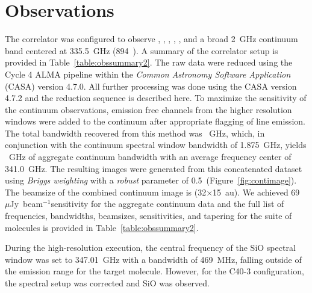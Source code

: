 \section{Observations}\label{sec:appobs}

The  correlator was configured to observe \lco, \lcso, \lhtcop, \lhtcn, \lsio, and a broad 2~GHz continuum band centered at 335.5~GHz (894~\micron). A summary of the correlator setup is provided in Table~\ref{table:obssummary2}. The raw data were reduced using the Cycle 4 ALMA pipeline within the \textit{Common Astronomy Software Application} (CASA) \citep{2007ASPC..376..127M} version 4.7.0. All further processing was done using the CASA version 4.7.2 and the reduction sequence is described here. To maximize the sensitivity of the continuum observations, emission free channels from the higher resolution windows were added to the continuum after appropriate flagging of line emission. The total bandwidth recovered from this method was ~GHz, which, in conjunction with the continuum spectral window bandwidth of 1.875~GHz, yields ~GHz of aggregate continuum bandwidth with an average frequency center of 341.0~GHz.
The resulting images were generated from this concatenated dataset using \textit{Briggs weighting} with a \textit{robust} parameter of 0.5~(Figure~\ref{fig:contimage}). The beamsize of the combined continuum image is \contbeam\space (32$\times$15~au). We achieved 69~$\mu$Jy~beam$^{-1}$\space sensitivity for the aggregate continuum data and the full list of frequencies, bandwidths, beamsizes, sensitivities, and tapering for the suite of molecules is provided in Table~\ref{table:obssummary2}.

During the high-resolution execution, the central frequency of the SiO spectral window was set to 347.01~GHz with a bandwidth of 469~MHz, falling outside of the emission range for the target molecule. However, for the C40-3 configuration, the spectral setup was corrected and SiO was observed.




